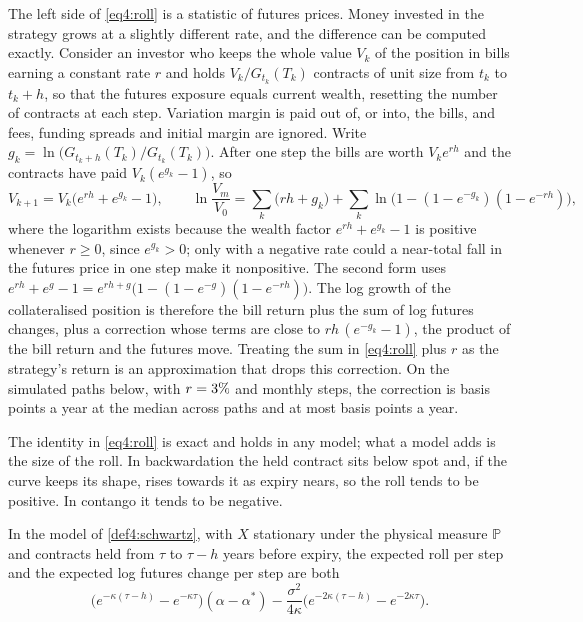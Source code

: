\begin{chapterrefs}
The left side of \cref{eq4:roll} is a statistic of futures prices. Money invested in the strategy
grows at a slightly different rate, and the difference can be computed exactly. Consider an investor who keeps the
whole value $V_k$ of the position in bills earning a constant rate $r$ and holds $V_k/G_{t_k}(T_k)$
contracts of unit size from $t_k$ to $t_k+h$, so that the futures exposure equals current wealth, resetting the number of contracts at each step. Variation margin is
paid out of, or into, the bills, and fees, funding spreads and initial margin are ignored. Write
$g_k=\ln\bigl(G_{t_k+h}(T_k)/G_{t_k}(T_k)\bigr)$. After one step the bills are worth $V_ke^{rh}$ and
the contracts have paid $V_k(e^{g_k}-1)$, so
\begin{equation}\label{eq4:wealth}
  V_{k+1}=V_k\bigl(e^{rh}+e^{g_k}-1\bigr),\qquad
  \ln\frac{V_m}{V_0}=\sum_k\bigl(rh+g_k\bigr)+\sum_k\ln\bigl(1-(1-e^{-g_k})(1-e^{-rh})\bigr),
\end{equation}
where the logarithm exists because the wealth factor $e^{rh}+e^{g_k}-1$ is positive whenever $r\ge0$,
since $e^{g_k}>0$; only with a negative rate could a near-total fall in the futures price in one
step make it nonpositive. The second form uses
$e^{rh}+e^{g}-1=e^{rh+g}\bigl(1-(1-e^{-g})(1-e^{-rh})\bigr)$. The log
growth of the collateralised position is therefore the bill return plus the sum of log futures
changes, plus a correction whose terms are close to $rh\,(e^{-g_k}-1)$, the product of the bill
return and the futures move. Treating the sum in \cref{eq4:roll} plus $r$ as the strategy's return is
an approximation that drops this correction. On the simulated paths below, with $r=3\%$ and
monthly steps, the correction is \rollGapMedBp{} basis points a year at the median across paths and
at most \rollGapMaxBp{} basis points a year.

The identity in \cref{eq4:roll} is exact and holds in any model; what a model adds is the size of the
roll. In backwardation the held contract sits below spot and, if the curve keeps its shape, rises
towards it as expiry nears, so the roll tends to be positive. In contango it tends to be negative.

\begin{proposition}\label{prop4:expectedroll}
In the model of \cref{def4:schwartz}, with $X$ stationary under the physical measure $\mathbb P$ and contracts
held from $\tau$ to $\tau-h$ years before expiry, the expected roll per step and the expected log
futures change per step are both
\begin{equation}\label{eq4:expectedroll}
  \bigl(e^{-\kappa(\tau-h)}-e^{-\kappa\tau}\bigr)(\alpha-\alpha^*)
  -\frac{\sigma^2}{4\kappa}\bigl(e^{-2\kappa(\tau-h)}-e^{-2\kappa\tau}\bigr).
\end{equation}
\end{proposition}


\end{chapterrefs}
